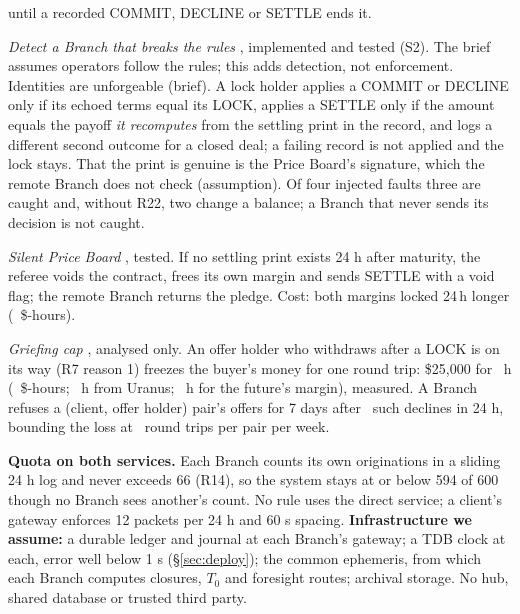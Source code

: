 \begin{description}[leftmargin=2.2em,style=sameline]
until a recorded COMMIT, DECLINE or SETTLE ends it.
\item[R22] \emph{Detect a Branch that breaks the rules} \extension, implemented and tested (S2). The brief assumes operators follow the rules; this adds
detection, not enforcement. Identities are unforgeable (brief). A lock holder applies a COMMIT or DECLINE only if its echoed terms equal its LOCK, applies a
SETTLE only if the amount equals the payoff \emph{it recomputes} from the settling print in the record, and logs a different second outcome for a closed
deal; a failing record is not applied and the lock stays. That the print is genuine is the Price Board's signature, which the remote Branch does not check
(assumption). Of four injected faults three are caught and, without R22, two change a balance; a Branch that never sends its decision is not caught.
\item[R23] \emph{Silent Price Board} \extension, tested. If no settling print exists 24 h after maturity, the referee voids the contract, frees its own
margin and sends SETTLE with a void flag; the remote Branch returns the pledge. Cost: both margins locked 24\,h longer (\SimVoidExtraDollarHours\ \$-hours).
\item[R24] \emph{Griefing cap} \extension, analysed only. An offer holder who withdraws after a LOCK is on its way (R7 reason 1) freezes the buyer's
money for one round trip: \$25{,}000 for \GriefVMHours\ h (\GriefVMDollarHours\ \$-hours; \GriefUranusHours\ h from Uranus; \GriefFutHours\ h for the
future's margin), measured. A Branch refuses a (client, offer holder) pair's offers for 7 days after \GriefCap\ such declines in 24 h, bounding the loss at
\GriefCap\ round trips per pair per week.
\end{description}

\textbf{Quota on both services.} Each Branch counts its own originations in a sliding 24 h log and never exceeds 66 (R14), so the system stays at or
below 594 of 600 though no Branch sees another's count. No rule uses the direct service; a client's gateway enforces 12 packets per 24 h and 60 s spacing.
\textbf{Infrastructure we assume:} a durable ledger and journal at each Branch's gateway; a TDB clock at each, error well below 1 s (\S\ref{sec:deploy}); the
common ephemeris, from which each Branch computes closures, $T_0$ and foresight routes; archival storage. No hub, shared database or trusted third party.
